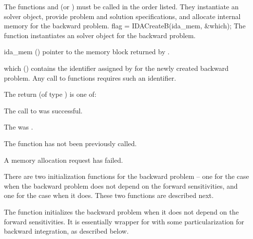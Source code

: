 The functions  and  (or ) must be 
called in the order listed. They instantiate an {\idas} solver object, provide problem 
and solution specifications, and allocate internal memory for the backward problem.
{
  flag = IDACreateB(ida\_mem, \&which);
}
{
  The function  instantiates an {\idas} solver object for the
  backward problem.
}
{
  \begin{args}
  \item[ida\_mem] ()
    pointer to the {\idas} memory block returned by .
  \item[which] ()
    contains the identifier assigned by {\idas} for the newly created backward 
    problem. Any call to  functions requires such an identifier.
  \end{args}
}
{
   The return  (of type ) is one of:
   \begin{args}
   \item[\Id{IDA\_SUCCESS}]
     The call to  was successful.
   \item[\Id{IDA\_MEM\_NULL}]
     The  was .
   \item[\Id{IDA\_NO\_ADJ}]
     The function  has not been previously called.
   \item[\Id{IDA\_MEM\_FAIL}]
     A memory allocation request has failed.
   \end{args}
}
{}
There are two initialization functions for the backward problem -- one for
the case when the backward problem does not depend on the forward
sensitivities, and one for the case when it does.  These two functions
are described next.

The function  initializes the backward problem when it does not
depend on the forward sensitivities.  It is essentially wrapper for 
with some particularization for backward integration, as described below.

